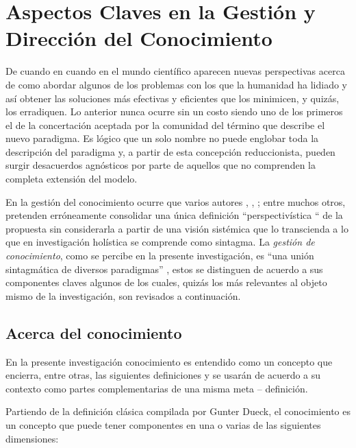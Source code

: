 \section{Aspectos Claves en la Gestión y Dirección del Conocimiento}

De cuando en cuando en el mundo científico aparecen nuevas perspectivas acerca de como abordar algunos de los problemas con los que la humanidad ha lidiado y así obtener las soluciones más efectivas y eficientes que los minimicen, y quizás, los erradiquen. Lo anterior nunca ocurre sin un costo siendo uno de los primeros el de la concertación aceptada por la comunidad del término que describe el nuevo paradigma. Es lógico que un solo nombre no puede englobar toda la descripción del paradigma y, a partir de esta concepción reduccionista, pueden surgir desacuerdos agnósticos por parte de aquellos que no comprenden la  completa extensión del modelo.

En la gestión del conocimiento ocurre que varios autores \cite{firestone2001}, \cite{bergeron2003}, \cite{davenport1998}; entre muchos otros, pretenden erróneamente consolidar una única definición “perspectivística “ de la propuesta sin considerarla a partir de una visión sistémica que lo transcienda a lo que en investigación holística se comprende como sintagma\cite{hurtado2000}. La \textit{gestión de conocimiento}, como se percibe en la presente investigación, es “una unión sintagmática de diversos paradigmas” \cite{hurtado2000}, estos se distinguen de acuerdo a sus componentes claves  algunos de los cuales, quizás los más relevantes al objeto mismo de la investigación, son revisados a continuación.

\subsection{Acerca del conocimiento}

En la presente investigación conocimiento es entendido como un concepto que encierra, entre otras, las siguientes definiciones y se usarán de acuerdo a su contexto como partes complementarias de una misma meta – definición.

Partiendo de la definición clásica compilada por Gunter Dueck\cite{dueck2001}, el conocimiento es un concepto que puede tener componentes en una o varias de las siguientes dimensiones:

